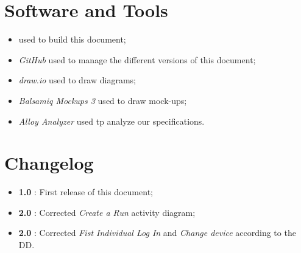 \section{Software and Tools}
\begin{itemize}
  \item \text{\LaTeX} used to build this document;
  \item \textit{GitHub} used to manage the different versions of this document;
  \item \textit{draw.io} used to draw diagrams;
  \item \textit{Balsamiq Mockups 3} used to draw mock-ups;
  \item \textit{Alloy Analyzer} used tp analyze our specifications.
\end{itemize}


\section{Changelog}
\begin{itemize}
  \item \textbf{1.0} : First release of this document;
  \item \textbf{2.0} : Corrected \textit{Create a Run} activity diagram;
  \item \textbf{2.0} : Corrected \textit{Fist Individual Log In} and \textit{Change device} according to the DD.
\end{itemize}
